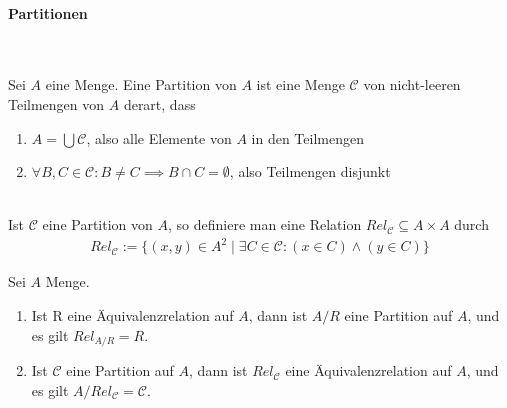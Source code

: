 \paragraph{Partitionen}	\
\begin{definition}
	Sei $A$ eine Menge. Eine Partition von $A$ ist eine Menge $\mathcal{C}$ von nicht-leeren Teilmengen von $A$ derart, dass
	\begin{enumerate}
		\item $A=\bigcup \mathcal{C}$, also alle Elemente von $A$ in den Teilmengen
		\item $\forall B,C \in \mathcal{C}: B \neq C \implies B \cap C = \emptyset$, also Teilmengen disjunkt
	\end{enumerate}
\end{definition}
\\
Ist $\mathcal{C}$ eine Partition von $A$, so definiere man eine Relation $Rel_{\mathcal{C}}\subseteq A \times A$ durch
\begin{align*}
	Rel_{\mathcal{C}} := \{(x,y)\in A^2\mid \exists C \in \mathcal{C}: (x\in C)\land(y \in C)\}
\end{align*}
\begin{theorem}
	Sei $A$ Menge.
	\begin{enumerate}
		\item Ist R eine Äquivalenzrelation auf $A$, dann ist $A/R$ eine Partition auf $A$,
		      und es gilt $Rel_{A/R}=R$.
		\item Ist $\mathcal{C}$ eine Partition auf $A$, dann ist $Rel_{\mathcal{C}}$ eine
		      Äquivalenzrelation auf $A$, und es gilt $A/Rel_{\mathcal{C}}=\mathcal{C}$.
	\end{enumerate}
\end{theorem}
